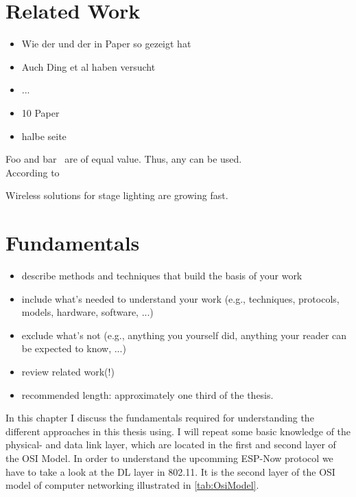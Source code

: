 \documentclass[]{ccs-thesis}
\begin{document}
\chapter{Related Work}
\begin{itemize}
	\item Wie der und der in Paper so gezeigt hat 
	\item Auch Ding et al haben versucht
	\item ...
	\item 10 Paper
	\item halbe seite
\end{itemize}

Foo and bar~\cite{LowCostMicrocontroller} are of equal value. Thus, any can be used.\\
According to~\cite{akyildiz2002survey}

Wireless solutions for stage lighting are growing fast. 


\chapter{Fundamentals}
\label{sec:fundamentals}

\begin{itemize}
	\item describe methods and techniques that build the basis of your work
	\item include what's needed to understand your work (e.g., techniques, protocols, models, hardware, software, ...)
	\item exclude what's not (e.g., anything you yourself did, anything your reader can be expected to know, ...)
	\item review related work(!)
	\item recommended length: approximately one third of the thesis.
\end{itemize}

In this chapter I discuss the fundamentals required for understanding the different approaches 
in this thesis using.
I will repeat some basic knowledge of the physical- and data link layer,
which are located in the first and second layer of the \ac{OSI} Model.
In order to understand the upcomming ESP-Now protocol we have to take a look at the \ac{DL} layer in 802.11.
It is the second layer of the \ac{OSI} model of computer networking illustrated in \cref{tab:OsiModel}.
\end{document}

